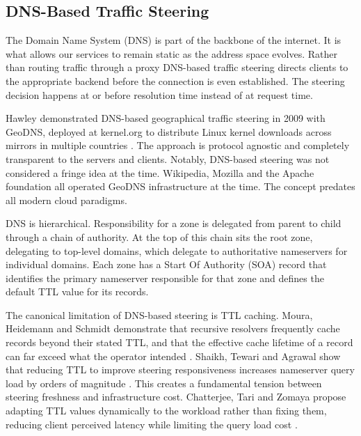 \documentclass[a4paper,11pt]{article}
\begin{document}
\subsection{DNS-Based Traffic Steering}
The Domain Name System (DNS) is part of the backbone of the internet.
It is what allows our services to remain static as the address space evolves.
Rather than routing traffic through a proxy DNS-based traffic steering directs clients to the appropriate
backend before the connection is even established. The steering decision happens at or before resolution time instead
of at request time.

Hawley demonstrated DNS-based geographical traffic steering in 2009 with GeoDNS,
deployed at kernel.org to distribute Linux kernel downloads across mirrors in multiple countries \cite{hawleyGeoDNSGeographicallyAware}.
The approach is protocol agnostic and completely transparent to the servers and clients. Notably, DNS-based steering was not
considered a fringe idea at the time. Wikipedia, Mozilla and the Apache foundation all operated GeoDNS infrastructure at the time.
The concept predates all modern cloud paradigms.

DNS is hierarchical. Responsibility for a zone is delegated from parent to child through a chain of authority.
At the top of this chain sits the root zone, delegating to top-level domains, which delegate to authoritative nameservers for individual domains.
Each zone has a Start Of Authority (SOA) record that identifies the primary 
nameserver responsible for that zone and defines the default TTL value for its records.

The canonical limitation of DNS-based steering is TTL caching. Moura, Heidemann and Schmidt demonstrate that recursive 
resolvers frequently cache records beyond their stated TTL, and that the effective cache lifetime of a record can far 
exceed what the operator intended \cite{mouraCacheMeIf2019}. Shaikh, Tewari and Agrawal show that reducing TTL 
to improve steering responsiveness increases nameserver query load by orders of magnitude \cite{shaikhEffectivenessDNSbasedServer2001}. 
This creates a fundamental tension between steering freshness and infrastructure cost.
Chatterjee, Tari and Zomaya propose adapting TTL values dynamically to the workload rather than fixing them, 
reducing client perceived latency while limiting the query load cost \cite{chatterjeeTaskbasedAdaptiveTTL2005}.
\end{document}
